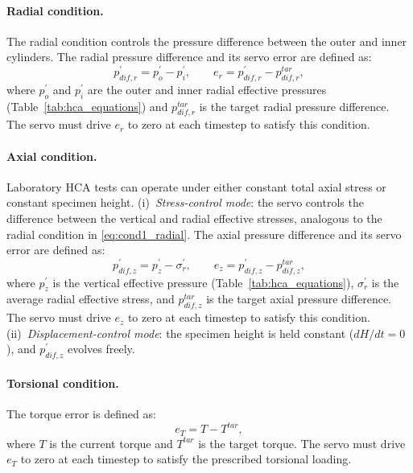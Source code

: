 \paragraph{Radial condition.}
The radial condition controls the pressure difference between the outer and inner cylinders. The radial pressure difference and its servo error are defined as:
\begin{equation}
p_{dif,r}^{\prime} = p_o^{\prime} - p_i^{\prime}, \qquad e_r = p_{dif,r}^{\prime} - p_{dif,r}^{tar},
\label{eq:cond1_radial}
\end{equation}
where $p_o^{\prime}$ and $p_i^{\prime}$ are the outer and inner radial effective pressures (Table~\ref{tab:hca_equations}) and $p_{dif,r}^{tar}$ is the target radial pressure difference. The servo must drive $e_r$ to zero at each timestep to satisfy this condition.

\paragraph{Axial condition.}
Laboratory HCA tests can operate under either constant total axial stress or constant specimen height.
(i)~\emph{Stress-control mode}: the servo controls the difference between the vertical and radial effective stresses, analogous to the radial condition in \cref{eq:cond1_radial}. The axial pressure difference and its servo error are defined as:
\begin{equation}
p_{dif,z}^{\prime} = p_z^{\prime} - \sigma_r^{\prime}, \qquad e_z = p_{dif,z}^{\prime} - p_{dif,z}^{tar},
\label{eq:cond2_axial}
\end{equation}
where $p_z^{\prime}$ is the vertical effective pressure (Table~\ref{tab:hca_equations}), $\sigma_r^{\prime}$ is the average radial effective stress, and $p_{dif,z}^{tar}$ is the target axial pressure difference. The servo must drive $e_z$ to zero at each timestep to satisfy this condition.
(ii)~\emph{Displacement-control mode}: the specimen height is held constant ($dH/dt=0$), and $p_{dif,z}^{\prime}$ evolves freely.

\paragraph{Torsional condition.}
The torque error is defined as:
\begin{equation}
e_T = T - T^{tar},
\label{eq:cond3_torsion_error}
\end{equation}
where $T$ is the current torque and $T^{tar}$ is the target torque. The servo must drive $e_T$ to zero at each timestep to satisfy the prescribed torsional loading.

